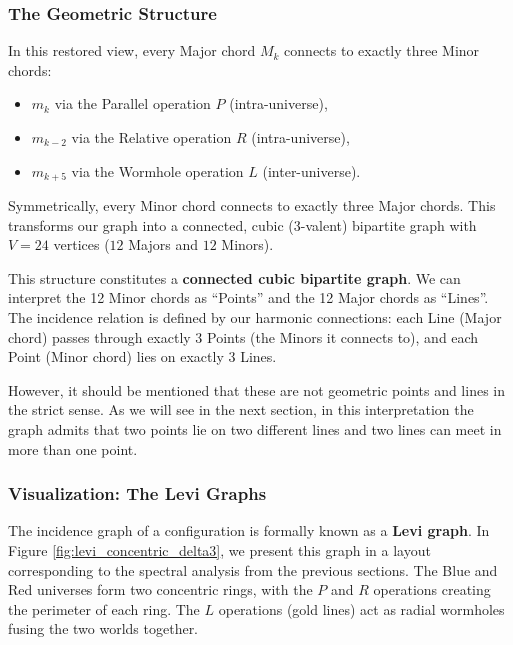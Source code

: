 \documentclass[12pt,letterpaper]{amsart}
\begin{document}
\subsubsection{The Geometric Structure} \label{gs}
In this restored view, every Major chord $M_k$ connects to exactly three Minor chords:
\begin{itemize}
    \item $m_k$ via the Parallel operation $P$ (intra-universe),
    \item $m_{k-2}$ via the Relative operation $R$ (intra-universe),
    \item $m_{k+5}$ via the Wormhole operation $L$ (inter-universe).
\end{itemize}
Symmetrically, every Minor chord connects to exactly three Major chords. This transforms our graph into a connected, cubic (3-valent) bipartite graph with $V=24$ vertices ($12$ Majors and $12$ Minors).

This structure constitutes a \textbf{connected cubic bipartite graph}. We can interpret the 12 Minor chords as ``Points'' and the 12 Major chords as ``Lines''. The incidence relation is defined by our harmonic connections: each Line (Major chord) passes through exactly 3 Points (the Minors it connects to), and each Point (Minor chord) lies on exactly 3 Lines.

However, it should be mentioned that these are not geometric points and lines in the strict sense. As we will see in the next section, in this interpretation the graph admits that two points lie on two different lines and two lines can meet in more than one point.




\subsubsection{Visualization: The Levi Graphs}
The incidence graph of a configuration is formally known as a \textbf{Levi graph}. In Figure \ref{fig:levi_concentric_delta3}, we present this graph in a layout corresponding to the spectral analysis from the previous sections. The Blue and Red universes form two concentric rings, with the $P$ and $R$ operations creating the perimeter of each ring. The $L$ operations (gold lines) act as radial wormholes fusing the two worlds together.
\end{document}
